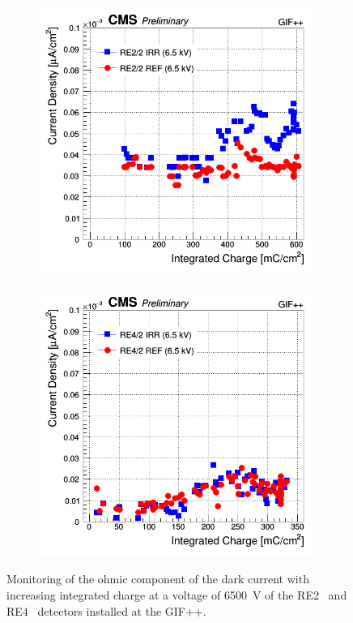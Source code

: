 	\begin{figure}[H]
    	\begin{subfigure}{0.5\linewidth}
    		\centering
			\includegraphics[width = \linewidth]{fig/chapt5/RE2-2-Dark-Current-vs-Time-6500.png}
        	\caption{\label{fig:GIFpp-Ohmic-mon:A}}
    	\end{subfigure}
    	\begin{subfigure}{0.5\linewidth}
			\centering
    		\includegraphics[width = \linewidth]{fig/chapt5/RE4-2-Dark-Current-vs-Time-6500.png}
        	\caption{\label{fig:GIFpp-Ohmic-mon:B}}
    	\end{subfigure}
		\caption{\label{fig:GIFpp-Ohmic-mon} Monitoring of the ohmic component of the dark current with increasing integrated charge at a voltage of \SI{6500}{V} of the RE2~ and RE4~ detectors installed at the GIF++.}
	\end{figure}
	
